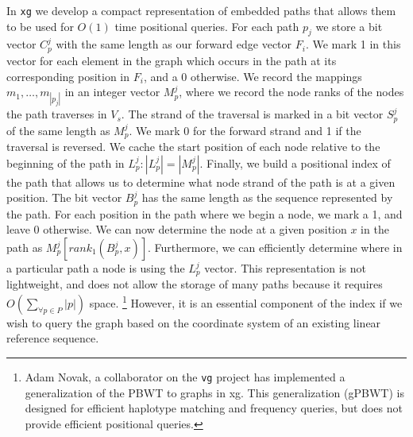\documentclass{article}
\begin{document}
In {\tt xg} we develop a compact representation of embedded paths that allows them to be used for $O(1)$ time positional queries.
For each path $p_j$ we store a bit vector $C_p^j$ with the same length as our forward edge vector $F_i$.
We mark 1 in this vector for each element in the graph which occurs in the path at its corresponding position in $F_i$, and a 0 otherwise.
We record the mappings $m_1, \ldots, m_{|p_j|}$ in an integer vector $M_p^j$, where we record the node ranks of the nodes the path traverses in $V_s$.
The strand of the traversal is marked in a bit vector $S_p^j$ of the same length as $M_p^j$.
We mark 0 for the forward strand and 1 if the traversal is reversed.
We cache the start position of each node relative to the beginning of the path in $L_p^j : |L_p^j| = |M_p^j|$.
Finally, we build a positional index of the path that allows us to determine what node strand of the path is at a given position.
The bit vector $B_p^j$ has the same length as the sequence represented by the path.
For each position in the path where we begin a node, we mark a 1, and leave 0 otherwise.
We can now determine the node at a given position $x$ in the path as $M_p^j[rank_1(B_p^j, x)]$.
Furthermore, we can efficiently determine where in a particular path a node is using the $L_p^j$ vector.
This representation is not lightweight, and does not allow the storage of many paths because it requires $O(\sum_{\forall p \in P}{|p|})$ space.
\footnote{Adam Novak, a collaborator on the {\tt vg} project has implemented a generalization of the PBWT to graphs in xg. This generalization (gPBWT) is designed for efficient haplotype matching and frequency queries, but does not provide efficient positional queries.}
However, it is an essential component of the index if we wish to query the graph based on the coordinate system of an existing linear reference sequence.
\end{document}
